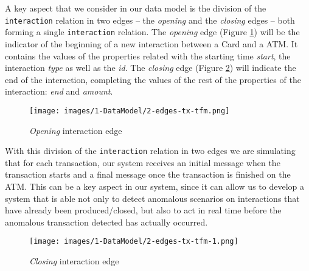 A key aspect that we consider in our data model is the division of the \texttt{interaction} relation in two edges -- the \emph{opening} and the \emph{closing} edges -- both forming a single \texttt{interaction} relation. The \emph{opening} edge (Figure \ref{img:opening-edge-1}) will be the indicator of the beginning of a new interaction between a Card and a ATM. It contains the values of the properties related with the starting time \emph{start}, the interaction \emph{type} as well as the \emph{id}. The \emph{closing} edge (Figure \ref{img:closing-edge-1}) will indicate the end of the interaction, completing the values of the rest of the properties of the interaction: \emph{end} and \emph{amount}.

\begin{figure}[H]
  \centering
  \texttt{[image: images/1-DataModel/2-edges-tx-tfm.png]}
  \caption{\emph{Opening} interaction edge}
  \label{img:opening-edge-1}
\end{figure}

With this division of the \texttt{interaction} relation in two edges we are simulating that for each transaction, our system receives an initial message when the transaction starts and a final message once the transaction is finished on the ATM. This can be a key aspect in our system, since it can allow us to develop a system that is able not only to detect anomalous scenarios on interactions that have already been produced/closed, but also to act in real time before the anomalous transaction detected has actually occurred.

\begin{figure}[H]
  \centering
  \texttt{[image: images/1-DataModel/2-edges-tx-tfm-1.png]}
  \caption{\emph{Closing} interaction edge}
  \label{img:closing-edge-1}
\end{figure}
